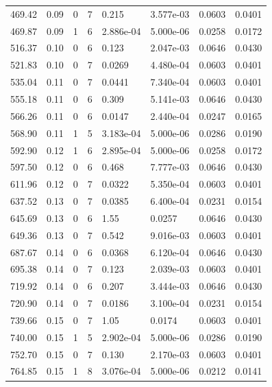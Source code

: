 \documentclass[preview]{standalone}
\begin{document}
{{{\begin{tabular}{L{1.2cm}C{1.2cm} C{0.3cm}C{0.5cm} C{1.4cm}C{1.4cm} C{1.4cm}C{1.4cm}}
  469.42  &  0.09  & 0     &  7 &  0.215  & 3.577e-03  & 0.0603 &  0.0401   \\ 
  469.87  &  0.09  & 1     &  6 &  2.886e-04  & 5.000e-06  & 0.0258 &  0.0172   \\ 
  516.37  &  0.10  & 0     &  6 &  0.123  & 2.047e-03  & 0.0646 &  0.0430   \\ 
  521.83  &  0.10  & 0     &  7 &  0.0269  & 4.480e-04  & 0.0603 &  0.0401   \\ 
  535.04  &  0.11  & 0     &  7 &  0.0441  & 7.340e-04  & 0.0603 &  0.0401   \\ 
  555.18  &  0.11  & 0     &  6 &  0.309  & 5.141e-03  & 0.0646 &  0.0430   \\ 
  566.26  &  0.11  & 0     &  6 &  0.0147  & 2.440e-04  & 0.0247 &  0.0165   \\ 
  568.90  &  0.11  & 1     &  5 &  3.183e-04  & 5.000e-06  & 0.0286 &  0.0190   \\ 
  592.90  &  0.12  & 1     &  6 &  2.895e-04  & 5.000e-06  & 0.0258 &  0.0172   \\ 
  597.50  &  0.12  & 0     &  6 &  0.468  & 7.777e-03  & 0.0646 &  0.0430   \\ 
  611.96  &  0.12  & 0     &  7 &  0.0322  & 5.350e-04  & 0.0603 &  0.0401   \\ 
  637.52  &  0.13  & 0     &  7 &  0.0385  & 6.400e-04  & 0.0231 &  0.0154   \\ 
  645.69  &  0.13  & 0     &  6 &  1.55  & 0.0257  & 0.0646 &  0.0430   \\ 
  649.36  &  0.13  & 0     &  7 &  0.542  & 9.016e-03  & 0.0603 &  0.0401   \\ 
  687.67  &  0.14  & 0     &  6 &  0.0368  & 6.120e-04  & 0.0646 &  0.0430   \\ 
  695.38  &  0.14  & 0     &  7 &  0.123  & 2.039e-03  & 0.0603 &  0.0401   \\ 
  719.92  &  0.14  & 0     &  6 &  0.207  & 3.444e-03  & 0.0646 &  0.0430   \\ 
  720.90  &  0.14  & 0     &  7 &  0.0186  & 3.100e-04  & 0.0231 &  0.0154   \\ 
  739.66  &  0.15  & 0     &  7 &  1.05  & 0.0174  & 0.0603 &  0.0401   \\ 
  740.00  &  0.15  & 1     &  5 &  2.902e-04  & 5.000e-06  & 0.0286 &  0.0190   \\ 
  752.70  &  0.15  & 0     &  7 &  0.130  & 2.170e-03  & 0.0603 &  0.0401   \\ 
  764.85  &  0.15  & 1     &  8 &  3.076e-04  & 5.000e-06  & 0.0212 &  0.0141   \\ 

\end{tabular}}}}
\end{document}
